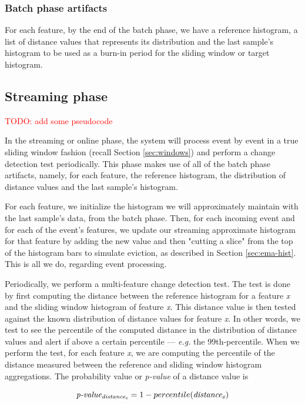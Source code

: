 \subsubsection*{Batch phase artifacts}
For each feature, by the end of the batch phase, we have a reference histogram, a list of distance values that represents its distribution and the last sample's histogram to be used as a burn-in period for the sliding window or target histogram.

\subsection{Streaming phase}
\textcolor{red}{TODO: add some pseudocode}

In the streaming or online phase, the system will process event by event in a true sliding window fashion (recall Section \ref{sec:windows}) and perform a change detection test periodically. This phase makes use of all of the batch phase artifacts, namely, for each feature, the reference histogram, the distribution of distance values and the last sample's histogram.

For each feature, we initialize the histogram we will approximately maintain with the last sample's data, from the batch phase. Then, for each incoming event and for each of the event's features, we update our streaming approximate histogram for that feature by adding the new value and then "cutting a slice" from the top of the histogram bars to simulate eviction, as described in Section \ref{sec:ema-hist}. This is all we do, regarding event processing.

Periodically, we perform a multi-feature change detection test. The test is done by first computing the distance between the reference histogram for a feature \textit{x} and the sliding window histogram of feature \textit{x}. This distance value is then tested against the known distribution of distance values for feature \textit{x}. In other words, we test to see the percentile of the computed distance in the distribution of distance values and alert if above a certain percentile --- \textit{e.g.} the 99th-percentile. When we perform the test, for each feature \textit{x}, we are computing the percentile of the distance measured between the reference and sliding window histogram aggregations. The probability value or \textit{p-value} of a distance value is 

\[\textit{p-value\textsubscript{distance\textsubscript{x}}} = 1 - percentile(\textit{distance\textsubscript{x}})\]

